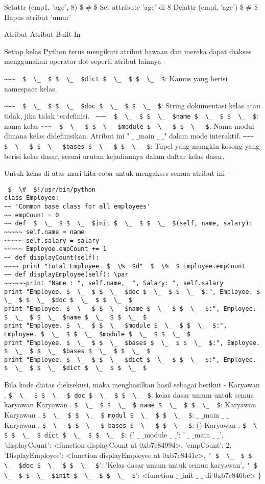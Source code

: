 Setattr (emp1, 'age', 8)  \$  \#  \$ Set attribute 'age' di 8
\noindent
Delattr (empl, 'age')  \$  \#  \$ Hapus atribut 'umur'


Atribut Atribut Built-In

Setiap kelas Python terus mengikuti atribut bawaan dan mereka dapat diakses menggunakan operator dot seperti atribut lainnya -

\verb|~~~  $  \_  $ $  \_  $dict $  \_  $ $  \_  $|: Kamus yang berisi namespace kelas.

\verb|~~~  $  \_  $ $  \_  $doc $  \_  $ $  \_  $|: String dokumentasi kelas atau tidak, jika tidak terdefinisi.
\verb| ~~~  $  \_  $ $  \_  $name $  \_  $ $  \_  $|: nama kelas
\verb|~~~  $  \_  $ $  \_  $module $  \_  $ $  \_  $|: Nama modul dimana kelas didefinisikan. Atribut ini " $  \_  $ $  \_  $main $  \_  $ $  \_  $" dalam mode interaktif.
\verb|~~~  $  \_  $ $  \_  $bases $  \_  $ $  \_  $|: Tupel yang mungkin kosong yang berisi kelas dasar, sesuai urutan kejadiannya dalam daftar kelas dasar.

Untuk kelas di atas mari kita coba untuk mengakses semua atribut ini –
\begin{verbatim}
 $  \#  $!/usr/bin/python
class Employee:
~~ 'Common base class for all employees'
~~ empCount = 0
~~ def  $  \_  $ $  \_  $init $  \_  $ $  \_  $(self, name, salary):
~~~~~ self.name = name
~~~~~ self.salary = salary
~~~~~ Employee.empCount += 1
~~ def displayCount(self):
~~~~ print "Total Employee  $  \%  $d"  $  \%  $ Employee.empCount
~~ def displayEmployee(self): \par
~~~~~~print "Name : ", self.name,  ", Salary: ", self.salary
print "Employee. $  \_  $ $  \_  $doc $  \_  $ $  \_  $:", Employee. $  \_  $ $  \_  $doc $  \_  $ $  \_  $
print "Employee. $  \_  $ $  \_  $name $  \_  $ $  \_  $:", Employee. $  \_  $ $  \_  $name $  \_  $ $  \_  $
print "Employee. $  \_  $ $  \_  $module $  \_  $ $  \_  $:", Employee. $  \_  $ $  \_  $module $  \_  $ $  \_  $
print "Employee. $  \_  $ $  \_  $bases $  \_  $ $  \_  $:", Employee. $  \_  $ $  \_  $bases $  \_  $ $  \_  $
print "Employee. $  \_  $ $  \_  $dict $  \_  $ $  \_  $:", Employee. $  \_  $ $  \_  $dict $  \_  $ $  \_  $
\end{verbatim}

Bila kode diatas dieksekusi, maka menghasilkan hasil sebagai berikut -
Karyawan . \verb|$  \_  $ $  \_  $ doc $  \_  $ $  \_  $|: kelas dasar umum untuk semua karyawan
Karyawan . \verb|$  \_  $ $  \_  $ name $  \_  $ $  \_  $|: Karyawan
Karyawan . \verb|$  \_  $ $  \_  $ modul $  \_  $ $  \_  $|:  $  \_  $ $  \_  $main $  \_  $ $  \_  $
Karyawan . \verb|$  \_  $ $  \_  $ bases $  \_  $ $  \_  $|: ()
Karyawan . \verb|$  \_  $ $  \_  $ dict $  \_  $ $  \_  $|:  $  \{  $' $  \_  $ $  \_  $module $  \_  $ $  \_  $': ' $  \_  $ $  \_  $main $  \_  $ $  \_  $', 'displayCount':
<function displayCount at 0xb7c84994>, 'empCount': 2,
'DisplayEmployee': <function displayEmployee at 0xb7c8441c>,
\verb|' $  \_  $ $  \_  $doc $  \_  $ $  \_  $|': 'Kelas dasar umum untuk semua karyawan',
\verb|' $  \_  $ $  \_  $init $  \_  $ $  \_  $|': <function  $  \_  $ $  \_  $init $  \_  $ $  \_  $ di 0xb7c846bc> $  \}  $ \par

